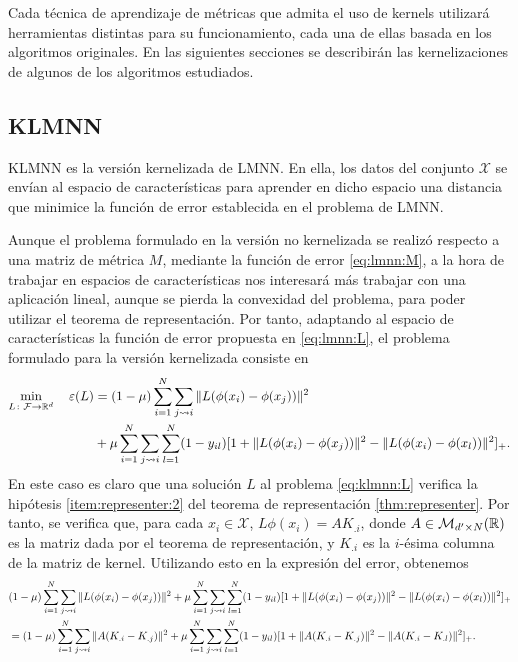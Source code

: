 Cada técnica de aprendizaje de métricas que admita el uso de kernels utilizará herramientas distintas para su funcionamiento, cada una de ellas basada en los algoritmos originales. En las siguientes secciones se describirán las kernelizaciones de algunos de los algoritmos estudiados.


\subsection{KLMNN}

KLMNN \cite{klmnn} es la versión kernelizada de LMNN. En ella, los datos del conjunto $\mathcal{X}$ se envían al espacio de características para aprender en dicho espacio una distancia que minimice la función de error establecida en el problema de LMNN.

Aunque el problema formulado en la versión no kernelizada se realizó respecto a una matriz de métrica $M$, mediante la función de error \ref{eq:lmnn:M}, a la hora de trabajar en espacios de características nos interesará más trabajar con una aplicación lineal, aunque se pierda la convexidad del problema, para poder utilizar el teorema de representación. Por tanto, adaptando al espacio de características la función de error propuesta en \ref{eq:lmnn:L}, el problema formulado para la versión kernelizada consiste en
\begin{equation} \label{eq:klmnn:L}
\begin{split}
    \min_{L\colon \mathcal{F} \to \mathbb{R}^{d}} \quad \varepsilon(L) &= (1-\mu)\sum_{i=1}^N\sum_{j \rightsquigarrow i} \|L(\phi(x_i) - \phi(x_j))\|^2 \\
                &+ \mu \sum_{i=1}^N\sum_{j \rightsquigarrow i} \sum_{l=1}^N(1-y_{il})[1 + \|L(\phi(x_i) - \phi(x_j))\|^2-\|L(\phi(x_i) - \phi(x_l))\|^2]_+. 
 \end{split}
\end{equation}
En este caso es claro que una solución $L$ al problema \ref{eq:klmnn:L} verifica la hipótesis \ref{item:representer:2} del teorema de representación \ref{thm:representer}. Por tanto, se verifica que, para cada $x_i \in \mathcal{X}$, $L\phi(x_i) = AK_{.i}$, donde $A \in \mathcal{M}_{d' \times N}(\mathbb{R})$ es la matriz dada por el teorema de representación, y $K_{.i}$ es la $i$-ésima columna de la matriz de kernel. Utilizando esto en la expresión del error, obtenemos
\begin{align*}
& (1-\mu)\sum_{i=1}^N\sum_{j \rightsquigarrow i} \|L(\phi(x_i) - \phi(x_j))\|^2 
                + \mu \sum_{i=1}^N\sum_{j \rightsquigarrow i} \sum_{l=1}^N(1-y_{il})[1 + \|L(\phi(x_i) - \phi(x_j))\|^2-\|L(\phi(x_i) - \phi(x_l))\|^2]_+ \\
&= (1-\mu)\sum_{i=1}^N\sum_{j \rightsquigarrow i} \|A(K_{.i} - K_{.j})\|^2 
                + \mu \sum_{i=1}^N\sum_{j \rightsquigarrow i} \sum_{l=1}^N(1-y_{il})[1 + \|A(K_{.i} - K_{.j})\|^2-\|A(K_{.i} - K_{.l})\|^2]_+.
 \end{align*}

